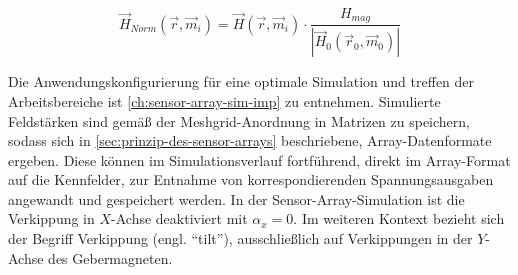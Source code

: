 \begin{equation}\label{eq:dipnorm}
	\vec{H}_{Norm}(\vec{r},\vec{m}_i) = \vec{H}(\vec{r},\vec{m}_i) \cdot \frac{H_{mag}}{|\vec{H}_0(\vec{r}_0,\vec{m}_0)|}
\end{equation}


Die Anwendungskonfigurierung für eine optimale Simulation und treffen der Arbeitsbereiche ist \autoref{ch:sensor-array-sim-imp} zu entnehmen. Simulierte Feldstärken sind gemäß der Meshgrid-Anordnung in Matrizen zu speichern, sodass sich in \autoref{sec:prinzip-des-sensor-arrays} beschriebene, Array-Datenformate ergeben. Diese können im Simulationsverlauf fortführend, direkt im Array-Format auf die Kennfelder, zur Entnahme von korrespondierenden Spannungsausgaben angewandt und gespeichert werden. In der Sensor-Array-Simulation ist die Verkippung in $X$-Achse deaktiviert mit $\alpha_x = 0$. Im weiteren Kontext bezieht sich der Begriff Verkippung (engl. ``tilt''), ausschließlich auf Verkippungen in der $Y$-Achse des Gebermagneten.


\clearpage

